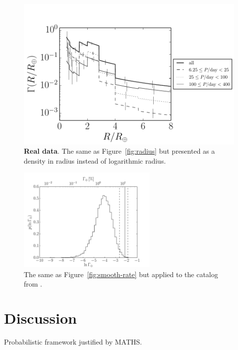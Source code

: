 \documentclass[12pt,preprint]{aastex}
\newcommand{\figref}[1]{\ref{fig:#1}}
\newcommand{\Fig}[1]{Figure~\figref{#1}}
\newcommand{\fig}[1]{\Fig{#1}}
\newcommand{\figlabel}[1]{\label{fig:#1}}
\begin{document}
\begin{figure}[p]
\begin{center}
\includegraphics{figures/results/linear-radius.pdf}
\end{center}
\caption{%
{\bf Real data}.
The same as \fig{radius} but presented as a density in radius instead of
logarithmic radius.
\figlabel{linear-radius}}
\end{figure}

\begin{figure}[p]
\begin{center}
\includegraphics[width=0.6\textwidth]{figures/results/rate.pdf}
\end{center}
\caption{%
The same as \fig{smooth-rate} but applied to the catalog from \citet{petigura}.
\figlabel{real-rate}}
\end{figure}

\section{Discussion}

Probabilistic framework justified by MATHS.
\end{document}
